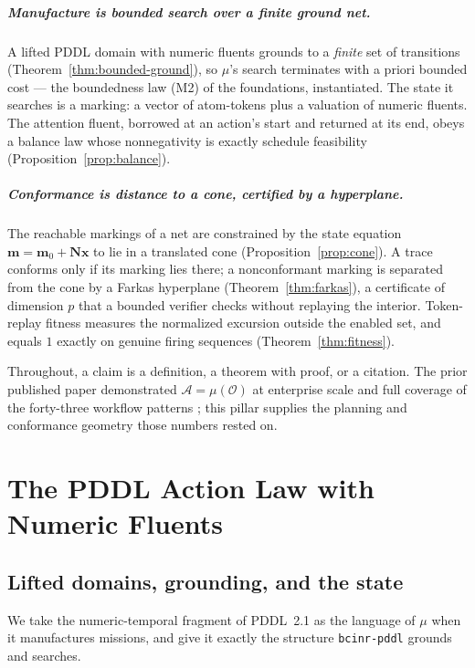 \documentclass[11pt,oneside]{book}
\theoremstyle{definition}
\theoremstyle{plain}
\theoremstyle{remark}
\newcommand{\Obs}{\mathcal{O}}                 %
\newcommand{\Act}{\mathcal{A}}                 %
\newcommand{\muop}{\mu}                        %
\newcommand{\Nmat}{\mathbf{N}}                 %
\newcommand{\code}[1]{\texttt{#1}}
\begin{document}
\paragraph{Manufacture is bounded search over a finite ground net.}
A lifted PDDL domain with numeric fluents grounds to a \emph{finite} set of transitions
(Theorem~\ref{thm:bounded-ground}), so $\muop$'s search terminates with a priori bounded cost
--- the boundedness law (M2) of the foundations, instantiated. The state it searches is a
marking: a vector of atom-tokens plus a valuation of numeric fluents. The attention fluent,
borrowed at an action's start and returned at its end, obeys a balance law whose
nonnegativity is exactly schedule feasibility (Proposition~\ref{prop:balance}).

\paragraph{Conformance is distance to a cone, certified by a hyperplane.}
The reachable markings of a net are constrained by the state equation $\bm m=\bm
m_{0}+\Nmat\bm x$ to lie in a translated cone (Proposition~\ref{prop:cone}). A trace conforms
only if its marking lies there; a nonconformant marking is separated from the cone by a
Farkas hyperplane (Theorem~\ref{thm:farkas}), a certificate of dimension $p$ that a
bounded verifier checks without replaying the interior. Token-replay fitness measures the
normalized excursion outside the enabled set, and equals $1$ exactly on genuine firing
sequences (Theorem~\ref{thm:fitness}).

Throughout, a claim is a definition, a theorem with proof, or a citation. The prior published
paper \cite{chatman2025} demonstrated $\Act=\muop(\Obs)$ at enterprise scale and full coverage
of the forty-three workflow patterns \cite{vdaalst2003patterns}; this pillar supplies the
planning and conformance geometry those numbers rested on.

\chapter{The PDDL Action Law with Numeric Fluents}
\label{ch:pddl}

\section{Lifted domains, grounding, and the state}

We take the numeric-temporal fragment of PDDL~2.1 \cite{foxlong2003} as the language of
$\muop$ when it manufactures missions, and give it exactly the structure \code{bcinr-pddl}
grounds and searches.
\end{document}
